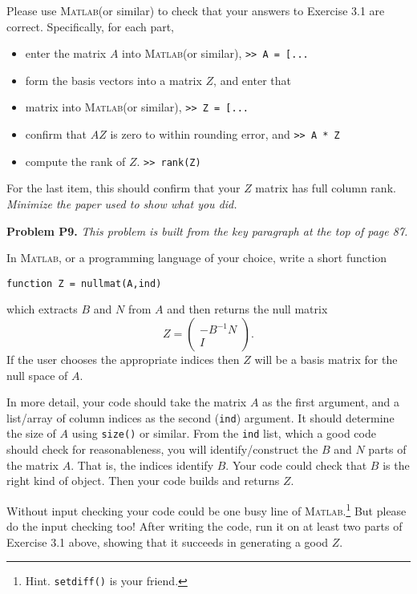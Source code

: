 \documentclass[12pt]{amsart}
\newcommand{\Matlab}{\textsc{Matlab}\xspace}
\newcommand{\prob}[1]{\bigskip\noindent\textbf{#1}\quad }
\begin{document}
\medskip
\noindent Please use \Matlab (or similar) to check that your answers to Exercise 3.1 are correct.  Specifically, for each part,
\begin{itemize}
\item enter the matrix $A$ into \Matlab (or similar),  \hfill {\footnotesize{\texttt{>> A = [...}}}
\item form the basis vectors into a matrix $Z$, and enter that
\item[] matrix into \Matlab (or similar),  \hfill {\footnotesize{\texttt{>> Z = [...}}}
\item confirm that $AZ$ is zero to within rounding error, and  \hfill {\footnotesize{\texttt{>> A * Z}}} \phantom{ldf}
\item compute the rank of $Z$.  \hfill {\footnotesize{\texttt{>> rank(Z)}}} \phantom{l}
\end{itemize}
For the last item, this should confirm that your $Z$ matrix has full column rank.  \emph{Minimize the paper used to show what you did.}


\prob{Problem P9.}  \emph{This problem is built from the key paragraph at the top of page 87.}

\medskip
\noindent In \Matlab, or a programming language of your choice, write a short function

\medskip
\qquad \texttt{function Z = nullmat(A,ind)}

\noindent which extracts $B$ and $N$ from $A$ and then returns the null matrix
	$$Z = \begin{pmatrix} - B^{-1} N \\ I\end{pmatrix}.$$
If the user chooses the appropriate indices then $Z$ will be a basis matrix for the null space of $A$.

In more detail, your code should take the matrix $A$ as the first argument, and a list/array of column indices as the second (\texttt{ind}) argument.  It should determine the size of $A$ using \texttt{size()} or similar.  From the \texttt{ind} list, which a good code should check for reasonableness, you will identify/construct the $B$ and $N$ parts of the matrix $A$.  That is, the indices identify $B$.  Your code could check that $B$ is the right kind of object.  Then your code builds and returns $Z$.

Without input checking your code could be one busy line of \Matlab.\footnote{Hint. \texttt{setdiff()} is your friend.}  But please do the input checking too!  After writing the code, run it on at least two parts of Exercise 3.1 above, showing that it succeeds in generating a good $Z$.
\end{document}
